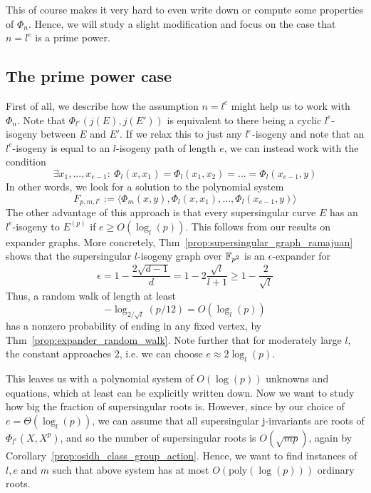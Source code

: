This of course makes it very hard to even write down or compute some properties of $\Phi_n$.
Hence, we will study a slight modification and focus on the case that $n = l^e$ is a prime power.

\subsection{The prime power case}
First of all, we describe how the assumption $n = l^e$ might help us to work with $\Phi_n$.
Note that $\Phi_{l^e}(j(E), j(E'))$ is equivalent to there being a cyclic $l^e$-isogeny between $E$ and $E'$.
If we relax this to just any $l^e$-isogeny and note that an $l^e$-isogeny is equal to an $l$-isogeny path of length $e$, we can instead work with the condition
\begin{equation*}
    \exists x_1, ..., x_{e - 1}: \ \Phi_l(x, x_1) = \Phi_l(x_1, x_2) = ... = \Phi_l(x_{e - 1}, y)
\end{equation*}
In other words, we look for a solution to the polynomial system
\begin{equation*}
    F_{p, m, l^e} := \langle \Phi_m(x, y), \Phi_l(x, x_1), ..., \Phi_l(x_{e - 1}, y) \rangle
\end{equation*}
The other advantage of this approach is that every supersingular curve $E$ has an $l^e$-isogeny to $E^{(p)}$ if $e \geq O(\log_l(p))$.
This follows from our results on expander graphs.
More concretely, Thm~\ref{prop:supersingular_graph_ramajuan} shows that the supersingular $l$-isogeny graph over $\mathbb{F}_{p^2}$ is an $\epsilon$-expander for
\begin{equation*}
    \epsilon = 1 - \frac {2\sqrt{d - 1}} d = 1 - 2 \frac {\sqrt{l}} {l + 1} \geq 1 - \frac 2 {\sqrt{l}}
\end{equation*}
Thus, a random walk of length at least
\begin{equation*}
    -\log_{2/\sqrt{l}}(p/12) = O(\log_l(p))
\end{equation*}
has a nonzero probability of ending in any fixed vertex, by Thm~\ref{prop:expander_random_walk}.
Note further that for moderately large $l$, the constant approaches $2$, i.e. we can choose $e \approx 2\log_l(p)$.

This leaves us with a polynomial system of $O(\log(p))$ unknowns and equations, which at least can be explicitly written down.
Now we want to study how big the fraction of supersingular roots is.
However, since by our choice of $e = \Theta(\log_l(p))$, we can assume that all supersingular j-invariants are roots of $\Phi_{l^e}(X, X^p)$, and so the number of supersingular roots is $O(\sqrt{mp})$, again by Corollary~\ref{prop:osidh_class_group_action}.
Hence, we want to find instances of $l, e$ and $m$ such that above system has at most $O(\mathrm{poly}(\log(p)))$ ordinary roots. 

